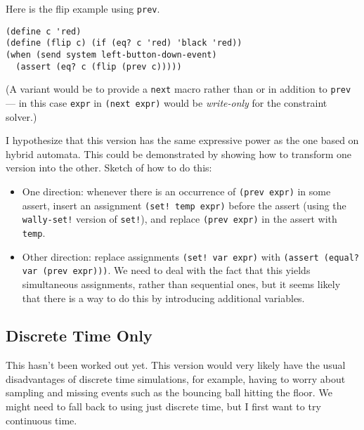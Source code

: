 \documentclass{article}
\begin{document}
Here is the flip example using \verb|prev|.

\begin{verbatim}
(define c 'red)
(define (flip c) (if (eq? c 'red) 'black 'red))
(when (send system left-button-down-event)
  (assert (eq? c (flip (prev c)))))
\end{verbatim}

(A variant would be to provide a \verb|next| macro rather than or in
addition to \verb|prev| --- in this case \verb|expr| in
\verb|(next expr)| would be \emph{write-only} for the constraint
solver.)

I hypothesize that this version has the same expressive power as the
one based on hybrid automata.  This could be demonstrated by showing how to
transform one version into the other.  Sketch of how to do this:

\begin{itemize}

\item One direction: whenever there is an occurrence of \verb|(prev expr)|
  in some assert, insert an assignment \verb|(set! temp expr)| before the
  assert (using the \verb|wally-set!| version of \verb|set!|), and replace
  \verb|(prev expr)| in the assert with \verb|temp|.

\item Other direction: replace assignments \verb|(set! var expr)| with
  \verb|(assert (equal? var (prev expr)))|.  We need to deal with the fact
  that this yields simultaneous assignments, rather than sequential ones,
  but it seems likely that there is a way to do this by introducing
  additional variables.

\end{itemize}

\subsection{Discrete Time Only}

This hasn't been worked out yet.  This version would very likely have the
usual disadvantages of discrete time simulations, for example, having to
worry about sampling and missing events such as the bouncing ball hitting
the floor.  We might need to fall back to using just discrete time, but I
first want to try continuous time.



\end{document}

